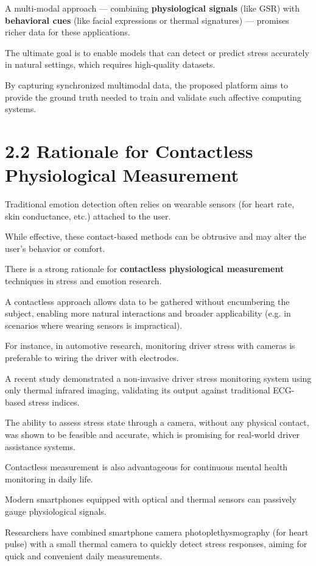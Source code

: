 A multi-modal approach --- combining \textbf{physiological signals}
 (like GSR) with \textbf{behavioral cues}
 (like facial expressions or thermal signatures) --- promises richer data for these
 applications.

The ultimate goal is to enable models that can detect or predict stress accurately in
natural settings, which requires high-quality datasets.

By capturing synchronized multimodal data, the proposed platform aims to provide the
ground truth needed to train and validate such affective computing systems.

\section{2.2 Rationale for Contactless Physiological Measurement}

Traditional emotion detection often relies on wearable sensors (for heart rate, skin
conductance, etc.) attached to the user.

While effective, these contact-based methods can be obtrusive and may alter the
user's behavior or comfort.

There is a strong rationale for \textbf{contactless physiological measurement}
 techniques in stress and emotion research.

A contactless approach allows data to be gathered without encumbering the subject,
enabling more natural interactions and broader applicability (e.g.  in scenarios
where wearing sensors is impractical).

For instance, in automotive research, monitoring driver stress with cameras is
preferable to wiring the driver with electrodes.

A recent study demonstrated a non-invasive driver stress monitoring system using only
thermal infrared imaging, validating its output against traditional ECG-based stress
indices.

The ability to assess stress state through a camera, without any physical contact,
was shown to be feasible and accurate, which is promising for real-world driver
assistance systems.

Contactless measurement is also advantageous for continuous mental health monitoring
in daily life.

Modern smartphones equipped with optical and thermal sensors can passively gauge
physiological signals.

Researchers have combined smartphone camera photoplethysmography (for heart pulse)
with a small thermal camera to quickly detect stress responses, aiming for quick and
convenient daily measurements.

